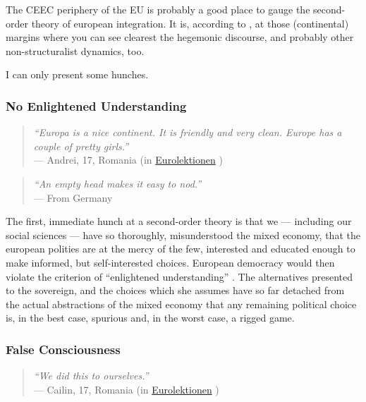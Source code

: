 \documentclass[11pt,a4paper,oneside,openright]{article}
\begin{document}
The \gls{CEEC} periphery of the \gls{EU} is probably a good place to gauge the second-order theory of european integration. 
It is, according to \cite{Foucault-1972-aa}, at those (continental) margins where you can see clearest the hegemonic discourse, and probably other non-structuralist dynamics, too.

I can only present some hunches.

\subsubsection[No Enlightened Understanding]{No Enlightened Understanding}

\begin{quote}
	\emph{``Europa is a nice continent. 
	It is friendly and very clean. 
	Europe has a couple of pretty girls.''}\\
	--- Andrei, 17, Romania (in \href{http://eurolektionen.de}{Eurolektionen} \citeyear{DeRuffray2010})
\end{quote}

\begin{quote}
	\emph{``An empty head makes it easy to nod.''}\\
	--- From Germany
\end{quote}

The first, immediate hunch at a second-order theory is that we --- including our social sciences --- have so thoroughly, misunderstood the mixed economy, that the european polities are at the mercy of the few, interested and educated enough to make informed, but self-interested choices. 
European democracy would then violate the criterion of ``enlightened understanding'' \citep{Dahl-1989-aa}. 
The alternatives presented to the sovereign, and the choices which she assumes have so far detached from the actual abstractions of the mixed economy that any remaining political choice is, in the best case, spurious and, in the worst case, a rigged game.

\subsubsection[False Consciousness]{False Consciousness}

\begin{quote}
	\emph{``We did this to ourselves.''}\\
	--- Cailin, 17, Romania (in \href{http://eurolektionen.de}{Eurolektionen} \citeyear{DeRuffray2010})
\end{quote}
\end{document}
